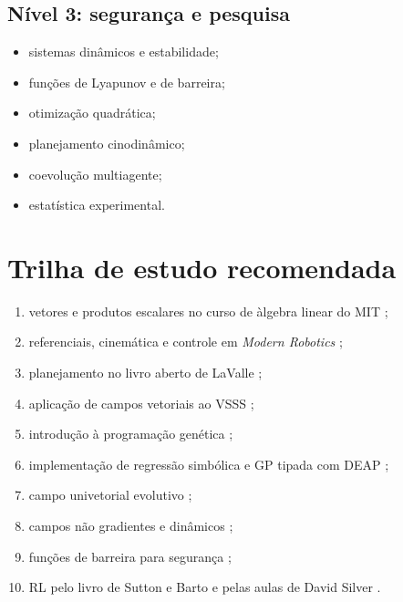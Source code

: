 \documentclass[12pt,a4paper]{article}
\begin{document}
\subsection{N\'ivel 3: seguran\c{c}a e pesquisa}

\begin{itemize}
  \item sistemas din\^amicos e estabilidade;
  \item fun\c{c}\~oes de Lyapunov e de barreira;
  \item otimiza\c{c}\~ao quadr\'atica;
  \item planejamento cinodin\^amico;
  \item coevolu\c{c}\~ao multiagente;
  \item estat\'istica experimental.
\end{itemize}

\section{Trilha de estudo recomendada}

\begin{enumerate}
  \item vetores e produtos escalares no curso de \`algebra linear do MIT \cite{strang};
  \item referenciais, cinem\'atica e controle em \textit{Modern Robotics} \cite{lynch2017};
  \item planejamento no livro aberto de LaValle \cite{lavalle2006};
  \item aplica\c{c}\~ao de campos vetoriais ao VSSS \cite{santos2019};
  \item introdu\c{c}\~ao \`a programa\c{c}\~ao gen\'etica \cite{poli2008};
  \item implementa\c{c}\~ao de regress\~ao simb\'olica e GP tipada com DEAP \cite{deap};
  \item campo univetorial evolutivo \cite{lim2008};
  \item campos n\~ao gradientes e din\^amicos \cite{panagou2014,he2022};
  \item fun\c{c}\~oes de barreira para seguran\c{c}a \cite{ames2019};
  \item RL pelo livro de Sutton e Barto \cite{sutton2018} e pelas aulas de David Silver \cite{silver2015}.
\end{enumerate}

\end{document}
